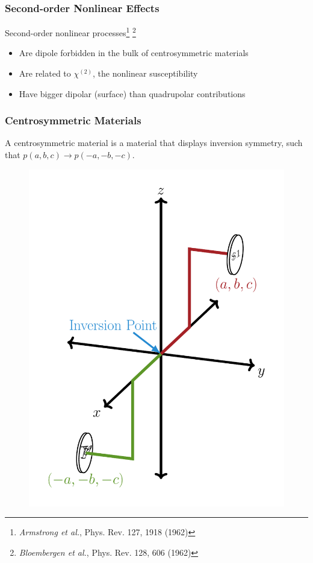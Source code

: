 \documentclass{beamer}
\begin{document}
\begin{frame}
\frametitle{Second-order Nonlinear Effects}
Second-order nonlinear processes\footnote{\emph{Armstrong et al.}, Phys. Rev.
127, 1918 (1962)}
\footnote{\emph{Bloembergen et al.}, Phys. Rev. 128, 606 (1962)}
\begin{itemize}
\item Are dipole forbidden in the bulk of centrosymmetric materials
\item Are related to $\chi^{(2)}$, the nonlinear susceptibility
\item Have bigger dipolar (surface) than quadrupolar contributions
\end{itemize}
\end{frame}

\begin{frame}
\frametitle{Centrosymmetric Materials}
A centrosymmetric material is a material that displays inversion symmetry, such
that $p(a,b,c) \rightarrow p(-a,-b,-c)$.
\begin{figure}
\centering
\includegraphics[height=0.7\textheight]{diag-centrosymmetry}
\end{figure}
\end{frame}
\end{document}
